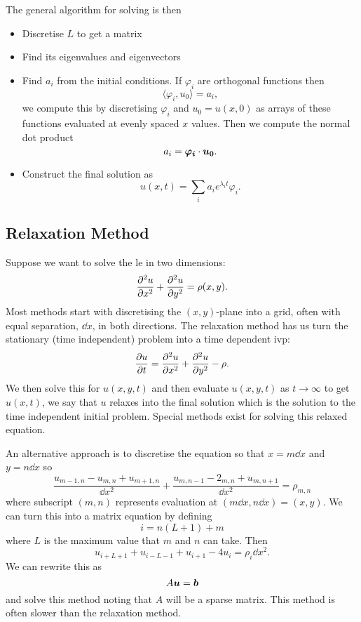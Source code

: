 \documentclass[a4paper]{article}
\begin{document}
    The general algorithm for solving is then
    \begin{itemize}
        \item Discretise \(L\) to get a matrix
        \item Find its eigenvalues and eigenvectors
        \item Find \(a_i\) from the initial conditions.
        If \(\varphi_i\) are orthogonal functions then
        \[\langle\varphi_i, u_0\rangle = a_i,\]
        we compute this by discretising \(\varphi_i\) and \(u_0 = u(x, 0)\) as arrays of these functions evaluated at evenly spaced \(x\) values.
        Then we compute the normal dot product
        \[a_i = \bm{\varphi_i}\cdot\bm{u_0}.\]
        \item Construct the final solution as
        \[u(x, t) = \sum_i a_ie^{\lambda_it}\varphi_i.\]
    \end{itemize}

    \subsection{Relaxation Method}
    Suppose we want to solve the \gls{le} in two dimensions:
    \[\pdv[2]{u}{x} + \pdv[2]{u}{y} = \rho(x, y).\]
    Most methods start with discretising the \((x, y)\)-plane into a grid, often with equal separation, \(\dd{x}\), in both directions.
    The relaxation method has us turn the stationary (time independent) problem into a time dependent \gls{ivp}:
    \[\pdv{u}{t} = \pdv[2]{u}{x} + \pdv[2]{u}{y} - \rho.\]
    We then solve this for \(u(x, y, t)\) and then evaluate \(u(x, y, t)\) as \(t \to\infty\) to get \(u(x, t)\), we say that \(u\) relaxes into the final solution which is the solution to the time independent initial problem.
    Special methods exist for solving this relaxed equation.
    
    An alternative approach is to discretise the equation so that \(x = m\dd{x}\) and \(y = n\dd{x}\) so
    \[\frac{u_{m-1,n} - u_{m,n} + u_{m+1,n}}{\dd{x}^2} + \frac{u_{m,n-1} - 2_{m,n} + u_{m,n+1}}{\dd{x}^2} = \rho_{m,n}\]
    where subscript \((m,n)\) represents evaluation at \((m\dd{x}, n\dd{x}) = (x, y)\).
    We can turn this into a matrix equation by defining
    \[i = n(L + 1) + m\]
    where \(L\) is the maximum value that \(m\) and \(n\) can take.
    Then
    \[u_{i+L+1} + u_{i-L-1} + u_{i+1} - 4u_i = \rho_i\dd{x}^2.\]
    We can rewrite this as
    \[A\bm{u} = \bm{b}\]
    and solve this method noting that \(A\) will be a sparse matrix.
    This method is often slower than the relaxation method.
    
\end{document}
